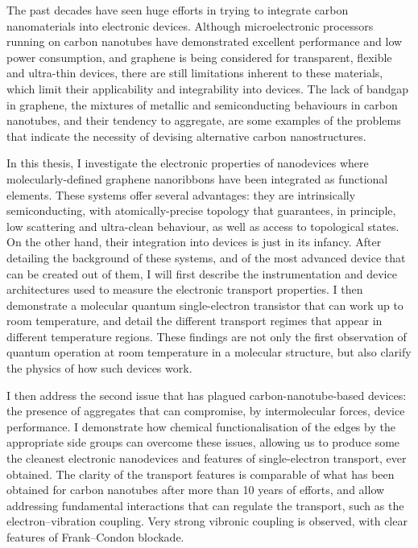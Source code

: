 The past decades have seen huge efforts in trying to integrate carbon nanomaterials into electronic devices. Although microelectronic processors running on carbon nanotubes have demonstrated excellent performance and low power consumption, and graphene is being considered for transparent, flexible and ultra-thin devices, there are still limitations inherent to these materials, which limit their applicability and integrability into devices. The lack of bandgap in graphene, the mixtures of metallic and semiconducting behaviours in carbon nanotubes, and their tendency to aggregate, are some examples of the problems that indicate the necessity of devising alternative carbon nanostructures.

In this thesis, I investigate the electronic properties of nanodevices where molecularly-defined graphene nanoribbons have been integrated as functional elements. These systems offer several advantages: they are intrinsically semiconducting, with atomically-precise topology that guarantees, in principle, low scattering and ultra-clean behaviour, as well as access to topological states. On the other hand, their integration into devices is just in its  infancy.
After detailing the background of these systems, and of the most advanced device that can be created out of them, I will first describe the instrumentation and device architectures used to measure the electronic transport properties. I then demonstrate a molecular quantum single-electron transistor that can work up to room temperature, and detail the different transport regimes that appear in different temperature regions. These findings are not only the first observation of quantum operation at room temperature in a molecular structure, but also clarify the physics of how such devices work.

I then address the second issue that has plagued carbon-nanotube-based devices: the presence of aggregates that can compromise, by intermolecular forces, device performance. I demonstrate how chemical functionalisation of the edges by the appropriate side groups can overcome these issues, allowing us to produce some the cleanest electronic nanodevices and features of single-electron transport, ever obtained. The clarity of the transport features is comparable of what has been obtained for carbon nanotubes after more than 10 years of efforts, and allow addressing fundamental interactions that can regulate the transport, such as the electron--vibration coupling. Very strong vibronic coupling is observed, with clear features of Frank--Condon blockade.

